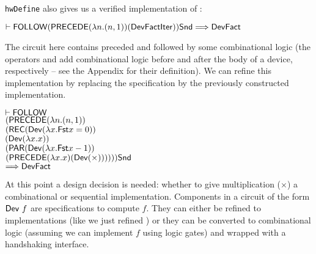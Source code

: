 \documentclass{llncs}
\begin{document}
\vspace*{-2mm}

\noindent \texttt{hwDefine} also gives us a verified implementation of
:

\vspace*{-2mm}

{\baselineskip10pt\begin{alltt}
\( \vdash \DEF{FOLLOW} (\DEF{PRECEDE} ({\lambda}n. (n,1)) (\DEF{Dev} \DEF{FactIter})) \DEF{Snd} \Longrightarrow \DEF{Dev} \DEF{Fact} \)
\end{alltt}}

\vspace*{-2mm}

\noindent The circuit here contains  preceded and
followed by some combinational logic (the operators  and
 add combinational logic before and after the body of a
device, respectively -- see the Appendix for their definition). We can
refine this implementation by replacing the specification
 by the previously constructed implementation.

\vspace*{-2mm}

{\baselineskip10pt\begin{alltt}
\( \vdash \DEF{FOLLOW}                                                                   \)
\(     (\DEF{PRECEDE} ({\lambda}n. (n,1))                                                \)
\(        (\DEF{REC} (\DEF{Dev} ({\lambda}x. \DEF{Fst} x = 0))                           \)
\(             (\DEF{Dev} ({\lambda}x. x))                                               \)
\(             (\DEF{PAR} (\DEF{Dev} ({\lambda}x. \DEF{Fst} x - 1))                      \)
\(                  (\DEF{PRECEDE} ({\lambda}x. x) (\DEF{Dev}({\times})))))) \DEF{Snd}   \)
\(    \Longrightarrow \DEF{Dev} \DEF{Fact}                                               \)
\end{alltt}}

\vspace*{-2mm}

At this point a design decision is needed: whether to give multiplication ($\times$)
a combinational or sequential implementation.
Components in a
circuit of the form $\mathsf{Dev}~f$ are specifications to compute
$f$. They can either be refined to implementations (like we just
refined ) or they can be converted to
combinational logic (assuming we can implement
$f$ using logic gates) and wrapped with a handshaking interface.
\end{document}
